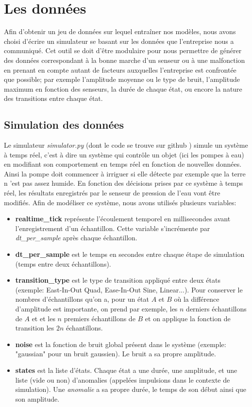 \documentclass[french]{article}
\theoremstyle{mytheoremstyle}
\theoremstyle{mytheoremstyle}
\theoremstyle{myproblemstyle}
\begin{document}
    \section{Les données}
    Afin d'obtenir un jeu de données sur lequel entraîner nos modèles, nous avons choisi d'écrire un simulateur se basant sur les données que l'entreprise nous a communiqué. Cet outil se doit d'être modulaire pour nous permettre de générer des données correspondant à la bonne marche d'un senseur ou à une malfonction en prenant en compte autant de facteurs auxquelles l'entreprise est confrontée que possible; par exemple l'amplitude moyenne ou le type de bruit, l'amplitude maximum en fonction des senseurs, la durée de chaque état, ou encore la nature des transitions entre chaque état.
        \subsection{Simulation des données}
       
        Le simulateur \textit{simulator.py} (dont le code se trouve sur github \cite{githubproject}) simule un système à temps réel, c'est à dire un système qui contrôle un objet (ici les pompes à eau) en modifiant son comportement en temps réel en fonction de nouvelles données. Ainsi la pompe doit commencer à irriguer si elle détecte par exemple que la terre n 'est pas assez humide. En fonction des décisions prises par ce système à temps réel, les résultats enregistrés par le senseur de pression de l'eau vont être modifiés. Afin de modéliser ce système, nous avons utilisés plusieurs variables:
        \begin{itemize}[label={•}]
            \item \textbf{realtime\_tick} représente l'écoulement temporel en millisecondes avant l'enregistrement d'un échantillon. Cette variable s'incrémente par \textit{dt\_per\_sample} après chaque échantillon.
            \item \textbf{dt\_per\_sample} est le temps en secondes entre chaque étape de simulation (temps entre deux échantillons).
            \item \textbf{transition\_type} est le type de transition appliqué entre deux états (exemple: East-In-Out Quad, Ease-In-Out Sine, Linear...). Pour conserver le nombres d'échantillons qu'on a, pour un état $A$ et $B$ où la différence d'amplitude est importante, on prend par exemple, les $n$ derniers échantillons de $A$ et et les $n$ premiers échantillons de $B$ et on applique la fonction de transition les $2n$ échantillons.
            \item \textbf{noise} est la fonction de bruit global présent dans le système (exemple: "gaussian" pour un bruit gaussien). Le bruit a sa propre amplitude. 
            \item \textbf{states} est la liste d'états. Chaque état a une durée, une amplitude, et une liste (vide ou non) d'anomalies (appelées impulsions dans le contexte de simulation). Une \textit{anomalie} a sa propre durée, le temps de son début ainsi que son amplitude.
        \end{itemize}
\end{document}

